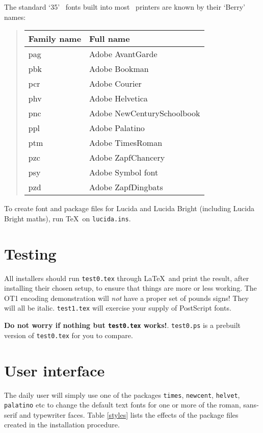 \documentclass{article}
\begin{document}
The standard `35' \PS\ fonts built into most \PS\ printers
are known by their `Berry' names:
\begin{quote}
  \begin{tabular}{|ll|}
\hline
Family name & Full name\\
\hline
pag&Adobe AvantGarde\\
pbk&Adobe Bookman\\
pcr&Adobe Courier\\
phv&Adobe Helvetica\\
pnc&Adobe NewCenturySchoolbook\\
ppl&Adobe Palatino\\
ptm&Adobe TimesRoman\\
pzc&Adobe ZapfChancery\\
psy&Adobe Symbol font\\
pzd&Adobe ZapfDingbats\\
\hline
\end{tabular}
\end{quote}

To create font and package files for Lucida and Lucida Bright (including
Lucida Bright maths), run \TeX\ on \texttt{lucida.ins}. 

\section{Testing}
All installers should run \texttt{test0.tex} through \LaTeX\ and print
the result, after installing their chosen setup, to ensure that things
are more or less working. The OT1 encoding demonstration will
\emph{not} have a proper set of pounds signs! They will all be italic.
\texttt{test1.tex} will exercise your supply of
PostScript fonts.

\textbf{Do not worry if nothing but \texttt{test0.tex} works!}.
\texttt{test0.ps} is a prebuilt version of \texttt{test0.tex} for you
to compare.

\section{User interface}

The daily user will simply use one of the packages \texttt{times},
\texttt{newcent}, \texttt{helvet}, \texttt{palatino} etc to change the
default text fonts for one or more of the roman, sans-serif and
typewriter faces.  Table \ref{styles} lists the effects of the package
files created in the installation procedure.
\end{document}
